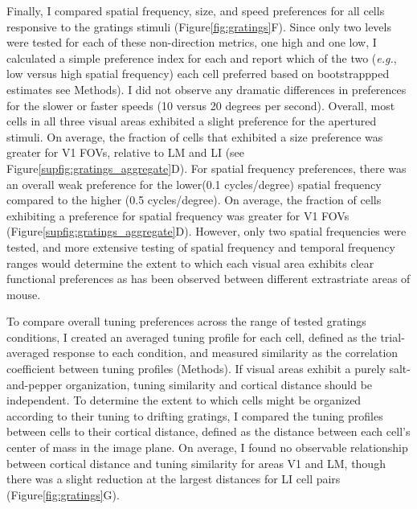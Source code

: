 
Finally, I compared spatial frequency, size, and speed preferences for all cells responsive to the gratings stimuli (Figure\ref{fig:gratings}F). Since only two levels were tested for each of these non-direction metrics, one high and one low, I calculated a simple preference index for each and report which of the two (\textit{e.g.}, low versus high spatial frequency) each cell preferred based on bootstrappped estimates see Methods). I did not observe any dramatic differences in preferences for the slower or faster speeds (10 versus 20 degrees per second). Overall, most cells in all three visual areas exhibited a slight preference for the apertured stimuli. On average, the fraction of cells that exhibited a size preference was greater for V1 FOVs, relative to LM and LI (see Figure\ref{supfig:gratings_aggregate}D). For spatial frequency preferences, there was an overall weak preference for the lower(0.1 cycles/degree) spatial frequency compared to the higher (0.5 cycles/degree). On average, the fraction of cells exhibiting a preference for spatial frequency was greater for V1 FOVs (Figure\ref{supfig:gratings_aggregate}D). However, only two spatial frequencies were tested, and more extensive testing of spatial frequency and temporal frequency ranges would determine the extent to which each visual area exhibits clear functional preferences as has been observed between different extrastriate areas of mouse\cite{Niell2008, Andermann2011, Marshel2011}. 


To compare overall tuning preferences across the range of tested gratings conditions, I created an averaged tuning profile for each cell, defined as the trial-averaged response to each condition, and measured similarity as the correlation coefficient between tuning profiles (Methods). If visual areas exhibit a purely salt-and-pepper organization, tuning similarity and cortical distance should be independent. To determine the extent to which cells might be organized according to their tuning to drifting gratings, I compared the tuning profiles between cells to their cortical distance, defined as the distance between each cell’s center of mass in the image plane. On average, I found no observable relationship between cortical distance and tuning similarity for areas V1 and LM, though there was a slight reduction at the largest distances for LI cell pairs (Figure\ref{fig:gratings}G). 

